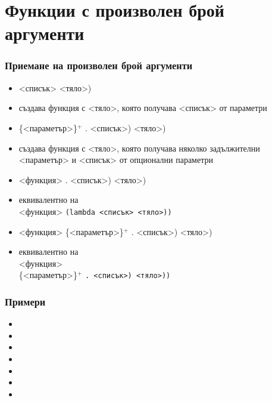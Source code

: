 \documentclass[alsotrans]{beamerswitch}
\begin{document}
\section{Функции с произволен брой аргументи}

\begin{frame}
  \frametitle{Приемане на произволен брой аргументи}

  \begin{itemize}[<+->]
  \item {} <списък> <тяло>\tta)
  \item създава функция с <тяло>, която получава <списък> от параметри
  \item {}\{<параметър>\}$^+$ \tta. <списък>\tta) <тяло>\tta)
  \item създава функция с <тяло>, която получава няколко задължителни <параметър> и <списък> от опционални параметри
  \item {}<функция> \tta. <списък>\tta) <тяло>\tta)
  \item еквивалентно на \\
     <функция> \tt{(lambda }<списък> <тяло>\tt{))}
  \item {}<функция> \{<параметър>\}$^+$ \tta. <списък>\tta) <тяло>\tta)
  \item еквивалентно на \\
     <функция>\\
    \hspace{5em}\{<параметър>\}$^+$ \tt. <списък>\tt) <тяло>\tt{))}
  \end{itemize}
\end{frame}

\begin{frame}
  \frametitle{Примери}

  \begin{itemize}[<+->]
  \item {}
  \item {}
  \item {}
  \item {}
  \item {}
  \item {}
  \item {}
  \end{itemize}
\end{frame}
\end{document}
